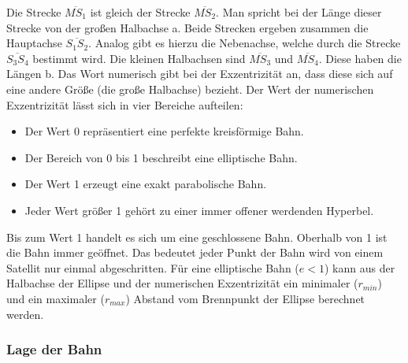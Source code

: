 Die Strecke \ensuremath{\overline{MS_{1}}} ist gleich der Strecke \ensuremath{\overline{MS_{2}}}. Man spricht bei der Länge dieser Strecke von der großen Halbachse a. Beide Strecken ergeben zusammen die Hauptachse \ensuremath{\overline{S_{1}S_{2}}}. Analog gibt es hierzu die Nebenachse, welche durch die Strecke \ensuremath{\overline{S_{3}S_{4}}} bestimmt wird. Die kleinen Halbachsen sind \ensuremath{\overline{MS_{3}}} und \ensuremath{\overline{MS_{4}}}. Diese haben die Längen b.  Das Wort numerisch gibt bei der Exzentrizität an, dass diese sich auf eine andere Größe (die große Halbachse) bezieht. Der Wert der numerischen Exzentrizität lässt sich in vier Bereiche aufteilen: 
\begin{itemize}
	\item Der Wert 0 repräsentiert eine perfekte kreisförmige Bahn.
	\item Der Bereich von 0 bis 1 beschreibt eine elliptische Bahn.
	\item Der Wert 1 erzeugt eine exakt parabolische Bahn.
	\item Jeder Wert größer 1 gehört zu einer immer offener werdenden Hyperbel.  
\end{itemize}   

Bis zum Wert 1 handelt es sich um eine geschlossene Bahn. Oberhalb von 1 ist die Bahn immer geöffnet. Das bedeutet jeder Punkt der Bahn wird von einem Satellit nur einmal abgeschritten. Für eine elliptische Bahn (\ensuremath{e < 1}) kann aus der Halbachse der Ellipse und der numerischen Exzentrizität ein minimaler (\ensuremath{r_{min}}) und ein maximaler (\ensuremath{r_{max}}) Abstand vom Brennpunkt der Ellipse berechnet werden.     

\subsubsection*{Lage der Bahn}

	

